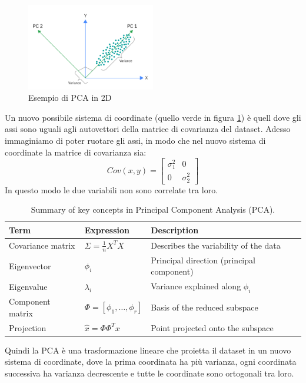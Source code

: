 \documentclass{../main.tex}[subfiles]
\begin{document}
\begin{figure}[H]
	\centering
	\includegraphics[width=0.5\textwidth]{pictures/pca.png}
	\caption{Esempio di PCA in 2D}
	\label{fig:pca}
\end{figure}
Un nuovo possibile sistema di coordinate (quello verde in figura \ref{fig:pca}) è quell dove gli assi sono uguali agli autovettori della matrice di covarianza del dataset.
Adesso immaginiamo di poter ruotare gli assi, in modo che nel nuovo sistema di coordinate la matrice di covarianza sia:
\[Cov(x,y)=\begin{bmatrix}
\sigma_1^2 & 0 \\
0 & \sigma_2^2
\end{bmatrix}\]
In questo modo le due variabili non sono correlate tra loro.
\begin{table}[H]
\centering

\begin{tabular}{lll}
\toprule
\textbf{Term} & \textbf{Expression} & \textbf{Description} \\
\midrule
Covariance matrix & $\Sigma = \frac{1}{n} X^{T} X$ & Describes the variability of the data \\
Eigenvector & $\phi_i$ & Principal direction (principal component) \\
Eigenvalue & $\lambda_i$ & Variance explained along $\phi_i$ \\
Component matrix & $\Phi = [\phi_1, \ldots, \phi_r]$ & Basis of the reduced subspace \\
Projection & $\hat{x} = \Phi \Phi^{T} x$ & Point projected onto the subspace \\
\bottomrule
\end{tabular}
\caption{Summary of key concepts in Principal Component Analysis (PCA).}
\end{table}
\noindent
Quindi la PCA è una trasformazione lineare che proietta il dataset in un nuovo sistema di coordinate, dove la prima coordinata ha più varianza,
ogni coordinata successiva ha varianza decrescente e tutte le coordinate sono ortogonali tra loro.
\\
\end{document}
